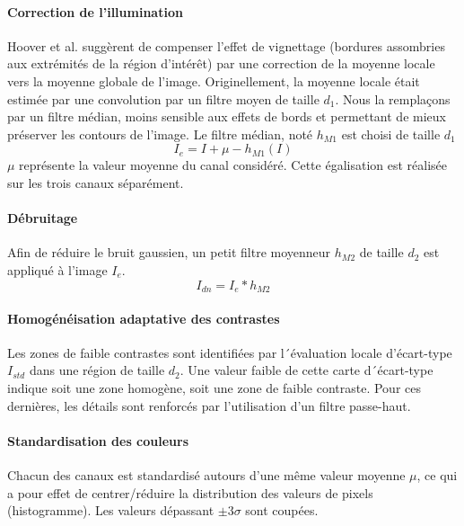 \paragraph{Correction de l'illumination}
Hoover et al. \cite{hooverLocatingOpticNerve2003} suggèrent de compenser l'effet de vignettage (bordures assombries aux extrémités de la région d'intérêt) par une correction de la moyenne locale vers la moyenne globale de l'image. Originellement, la moyenne locale était estimée par une convolution par un filtre moyen de taille $d_1$. Nous la remplaçons par un filtre médian, moins sensible aux effets de bords et permettant de mieux préserver les contours de l'image. Le filtre médian, noté $h_{M1}$ est choisi de taille $d_1$
\begin{equation}
	I_e = I + \mu - h_{M1}(I)
\end{equation}
$\mu$ représente la valeur moyenne du canal considéré. Cette égalisation est réalisée sur les trois canaux séparément.
\paragraph{Débruitage}
Afin de réduire le bruit gaussien, un petit filtre moyenneur $h_{M2}$ de taille $d_2$ est appliqué à l'image $I_e$.
\begin{equation}
	I_{dn} = I_e * h_{M2}
\end{equation}
\paragraph{Homogénéisation adaptative des contrastes}
Les zones de faible contrastes sont identifiées par l´évaluation locale d'écart-type $I_{std}$ dans une région de taille $d_2$. Une valeur faible de cette carte d´écart-type indique soit une zone homogène, soit une zone de faible contraste. Pour ces dernières, les détails sont renforcés par l'utilisation d'un filtre passe-haut. 

\paragraph{Standardisation des couleurs}
Chacun des canaux est standardisé autours  d'une même valeur moyenne $\mu$, ce qui a pour effet de centrer/réduire la distribution des valeurs de pixels (histogramme). Les valeurs dépassant $\pm 3 \sigma$ sont coupées.
